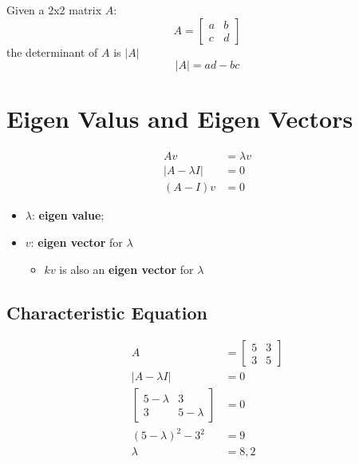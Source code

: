   Given a 2x2 matrix $ A $:
  \begin{displaymath}
    A = 
    \begin{bmatrix}
      a & b \\
      c & d 
    \end{bmatrix}
  \end{displaymath}
  the determinant of $ A $ is $ \left| A \right| $
  \begin{equation}
    \left| A \right| = ad - bc 
  \end{equation}
  
\section{Eigen Valus and Eigen Vectors}

  \begin{align}
    Av &= \lambda v \\
    \left| A - \lambda I \right| &= 0 \\
    \left( A - I \right)v &= 0
  \end{align}
  
  \begin{itemize}
    \item $ \lambda $: \textbf{eigen value};
    \item $ v $: \textbf{eigen vector} for $ \lambda $
    \begin{itemize}
      \item $ kv $ is also an \textbf{eigen vector} for $ \lambda $
    \end{itemize}
  \end{itemize}
  
  \subsection{Characteristic Equation}
  
    \begin{align*}
      A &= 
      \begin{bmatrix}
        5 & 3 \\
        3 & 5
      \end{bmatrix} 
      \\
      \left| A - \lambda I \right| &= 0 \\
      \begin{bmatrix}
        5 - \lambda & 3 \\
        3 & 5 - \lambda
      \end{bmatrix} &= 0 
      \\
      \left( 5 - \lambda \right)^{2} - 3^{2} &= 9 \\
      \lambda &= 8, 2
    \end{align*}
    
